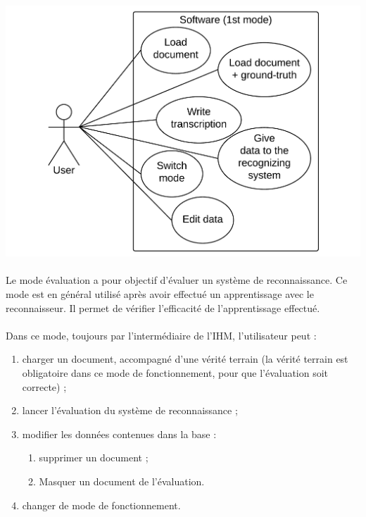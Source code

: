 \begin{mdframed}[frametitle={Figure 2 : Diagramme de cas d'utilisation (mode apprentissage)}, innerbottommargin=10]
\begin{center}
\includegraphics[scale=0.6]{Usecase_1.pdf}
\end{center}
\end{mdframed}

\paragraph{}

Le mode évaluation a pour objectif d’évaluer un système de reconnaissance. Ce
mode est en général utilisé après avoir effectué un apprentissage avec le
reconnaisseur. Il permet de vérifier l’efficacité de l’apprentissage effectué.

\paragraph{}

Dans ce mode, toujours par l’intermédiaire de l’IHM, l’utilisateur peut :
\begin{enumerate}
\item charger un document, accompagné d’une vérité terrain (la vérité terrain
est obligatoire dans ce mode de fonctionnement, pour que l’évaluation soit
correcte) ;
\item lancer l’évaluation du système de reconnaissance ;
\item modifier les données contenues dans la base :
\begin{enumerate}
\item supprimer un document ;
\item Masquer un document de l’évaluation.
\end{enumerate}
\item changer de mode de fonctionnement.
\end{enumerate}

